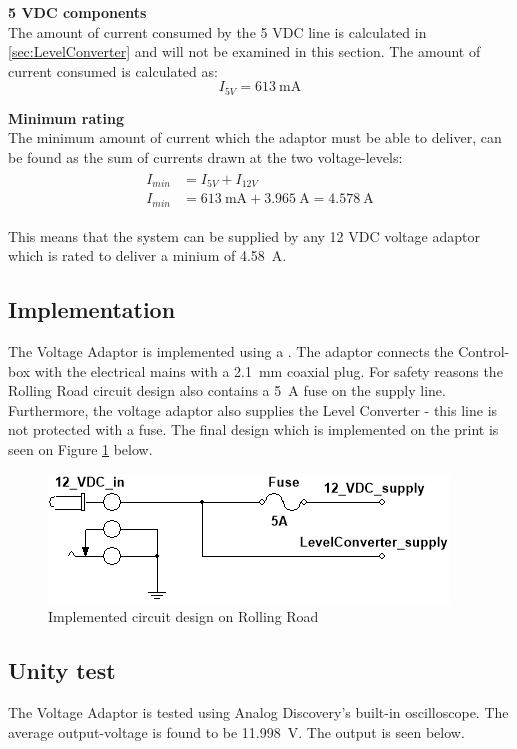 \textbf{5 VDC components}\\
The amount of current consumed by the 5 VDC line is calculated in \vref{sec:LevelConverter} and will not be examined in this section. The amount of current consumed is calculated as:
\begin{equation}
	I_{5V} = \SI{613}{\milli \ampere}
\end{equation}

\textbf{Minimum rating}\\
The minimum amount of current which the adaptor must be able to deliver, can be found as the sum of currents drawn at the two voltage-levels:
\begin{align}
	\begin{split}
		I_{min} &= I_{5V} + I_{12V}\\
		I_{min} &= \SI{613}{\milli \ampere} + \SI{3.965}{\ampere} = \SI{4.578}{\ampere}
	\end{split}
\end{align}

This means that the system can be supplied by any 12 VDC voltage adaptor which is rated to deliver a minium of \SI{4.58}{\ampere}.

\subsection{Implementation}
The Voltage Adaptor is implemented using a . The adaptor connects the Control-box with the electrical mains with a \SI{2.1}{\milli \meter} coaxial plug. For safety reasons the Rolling Road circuit design also contains a \SI{5}{\ampere} fuse on the supply line. Furthermore, the voltage adaptor also supplies the Level Converter - this line is not protected with a fuse. The final design which is implemented on the print is seen on Figure \ref{fig:DesignVoltageAdaptor} below.

\begin{figure}[H]
	\centering
	\includegraphics[width=0.5\linewidth]{Hardware/Pictures/DesignVoltageAdaptor}
	\caption{Implemented circuit design on Rolling Road}
	\label{fig:DesignVoltageAdaptor}
\end{figure}

\subsection{Unity test}
The Voltage Adaptor is tested using Analog Discovery's built-in oscilloscope. The average output-voltage is found to be \SI{11.998}{\volt}. The output is seen below.

